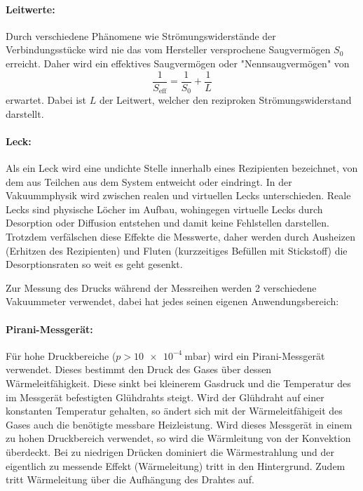  \paragraph{Leitwerte:}
 Durch verschiedene Phänomene wie Strömungswiderstände der Verbindungsstücke wird nie das vom Hersteller versprochene Saugvermögen $S_0$ erreicht.
 Daher wird ein effektives Saugvermögen oder "Nennsaugvermögen" von
 \begin{equation}
   \frac{1}{S_\text{eff}} = \frac{1}{S_0} + \frac{1}{L}
   \label{eqn:effSaug}
 \end{equation}
 erwartet. Dabei ist $L$ der Leitwert, welcher den reziproken Strömungswiderstand darstellt.

 \paragraph{Leck:}
 Als ein Leck wird eine undichte Stelle innerhalb eines Rezipienten bezeichnet, von dem aus Teilchen aus dem System
 entweicht oder eindringt.
 In der Vakuummphysik wird zwischen realen und virtuellen Lecks unterschieden. Reale Lecks sind physische Löcher
 im Aufbau, wohingegen virtuelle Lecks durch Desorption oder Diffusion entstehen und damit keine Fehlstellen darstellen.
 Trotzdem verfälschen diese Effekte die Messwerte, daher werden durch Ausheizen (Erhitzen des Rezipienten) und Fluten (kurzzeitiges
 Befüllen mit Stickstoff) die Desorptionsraten so weit es geht gesenkt.

 Zur Messung des Drucks während der Messreihen werden 2 verschiedene Vakuummeter verwendet, dabei hat jedes seinen eigenen Anwendungsbereich:

 \paragraph{Pirani-Messgerät:}
 Für hohe Druckbereiche ($p > \SI{10e-4}{\milli\bar}$) wird ein Pirani-Messgerät verwendet. Dieses bestimmt den Druck des Gases über dessen Wärmeleitfähigkeit. Diese sinkt
 bei kleinerem Gasdruck und die Temperatur des im Messgerät befestigten Glühdrahts steigt. Wird der Glühdraht auf einer konstanten Temperatur gehalten,
 so ändert sich mit der Wärmeleitfähigeit des Gases auch die benötigte messbare Heizleistung.
 Wird dieses Messgerät in einem zu hohen Druckbereich verwendet, so wird die Wärmleitung von der Konvektion überdeckt. Bei zu niedrigen
 Drücken dominiert die Wärmestrahlung und der eigentlich zu messende Effekt (Wärmeleitung) tritt in den Hintergrund. Zudem tritt Wärmeleitung
 über die Aufhängung des Drahtes auf.

